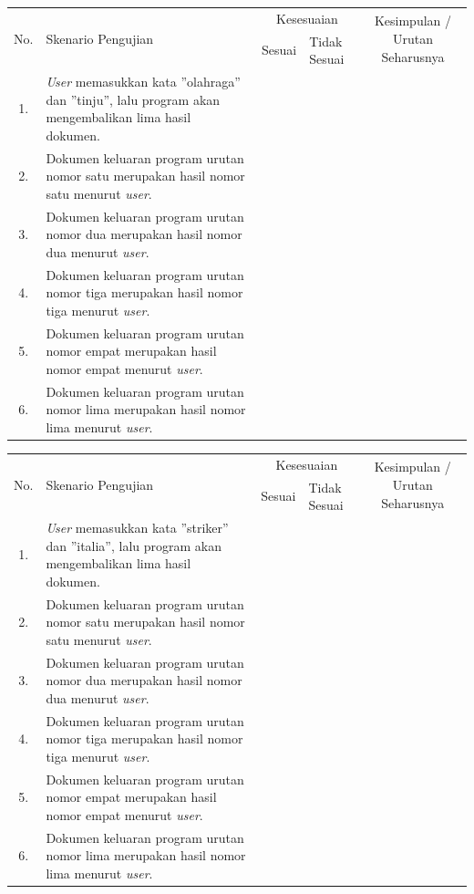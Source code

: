 \documentclass[12pt]{report}
\begin{document}
\begin{center}
\begin{tabular}{ |c|    m{6cm}         |c|m{1cm}| c |  }
\hline
\multirow{2}{*}{No.} & \multirow{2}{6cm}{Skenario Pengujian} & \multicolumn{2}{c|}{Kesesuaian} &\multirow{2}{2.3cm}{Kesimpulan / Urutan Seharusnya} \\\cline{3-4}
	&			& Sesuai	&	Tidak Sesuai   	&		\\
 \hline
  1.&\textit{User} memasukkan kata ''olahraga'' dan ''tinju'', lalu program akan mengembalikan lima hasil dokumen.&	&	& \\
\hline
 2.&Dokumen keluaran program urutan nomor satu merupakan hasil nomor satu menurut \textit{user}.&	&	& \\
 \hline
 3.&Dokumen keluaran program urutan nomor dua merupakan hasil nomor dua menurut \textit{user}.&	&	& \\
 \hline
 4.&Dokumen keluaran program urutan nomor tiga merupakan hasil nomor tiga menurut \textit{user}.&	&	& \\
 \hline
5.&Dokumen keluaran program urutan nomor empat merupakan hasil nomor empat menurut \textit{user}.&	&	& \\
 \hline
6.&Dokumen keluaran program urutan nomor lima merupakan hasil nomor lima menurut \textit{user}.&	&	& \\
 \hline
\end{tabular}
  \end{center}

\begin{center}
\begin{tabular}{ |c|    m{6cm}         |c|m{1cm}| c |  }
\hline
\multirow{2}{*}{No.} & \multirow{2}{6cm}{Skenario Pengujian} & \multicolumn{2}{c|}{Kesesuaian} &\multirow{2}{2.3cm}{Kesimpulan / Urutan Seharusnya} \\\cline{3-4}
	&			& Sesuai	&	Tidak Sesuai   	&		\\
 \hline
  1.&\textit{User} memasukkan kata ''striker'' dan ''italia'', lalu program akan mengembalikan lima hasil dokumen.&	&	& \\
\hline
 2.&Dokumen keluaran program urutan nomor satu merupakan hasil nomor satu menurut \textit{user}.&	&	& \\
 \hline
 3.&Dokumen keluaran program urutan nomor dua merupakan hasil nomor dua menurut \textit{user}.&	&	& \\
 \hline
 4.&Dokumen keluaran program urutan nomor tiga merupakan hasil nomor tiga menurut \textit{user}.&	&	& \\
 \hline
5.&Dokumen keluaran program urutan nomor empat merupakan hasil nomor empat menurut \textit{user}.&	&	& \\
 \hline
6.&Dokumen keluaran program urutan nomor lima merupakan hasil nomor lima menurut \textit{user}.&	&	& \\
 \hline
\end{tabular}
 \end{center}
 
\end{document}

